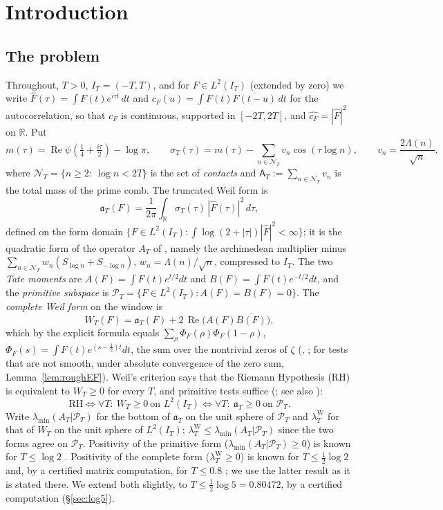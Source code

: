 \documentclass[11pt]{amsart}
\theoremstyle{definition}
\theoremstyle{remark}
\newcommand{\R}{\mathbb R}
\newcommand{\Rel}{\operatorname{Re}}
\newcommand{\PT}{\mathcal P_T}
\newcommand{\IT}{I_T}
\newcommand{\lamW}{\lambda^{\mathrm W}_T}
\newcommand{\lamA}{\lambda_{\min}(A_T|\PT)}
\newcommand{\sT}{\sigma_T}
\newcommand{\Fh}{\widehat F}
\newcommand{\cF}{c_F}
\newcommand{\NT}{\mathcal N_T}
\newcommand{\Aconst}{\mathsf A_T}
\begin{document}
\section{Introduction}

\subsection{The problem}
Throughout, $T>0$, $\IT=(-T,T)$, and for $F\in L^2(\IT)$ (extended by zero) we write
$\Fh(\tau)=\int F(t)e^{i\tau t}\,dt$ and $\cF(u)=\int F(t)\overline{F(t-u)}\,dt$ for the
autocorrelation, so that $\cF$ is continuous, supported in $[-2T,2T]$, and
$\widehat{\cF}=|\Fh|^2$ on $\R$. Put
\begin{equation}\label{eq:symbol}
m(\tau)=\Rel\psi\!\left(\tfrac14+\tfrac{i\tau}{2}\right)-\log\pi,\qquad
\sT(\tau)=m(\tau)-\sum_{n\in\NT}v_n\cos(\tau\log n),\qquad v_n=\frac{2\Lambda(n)}{\sqrt n},
\end{equation}
where $\NT=\{n\ge2:\ \log n<2T\}$ is the set of \emph{contacts} and
$\Aconst:=\sum_{n\in\NT}v_n$ is the total mass of the prime comb. The truncated Weil form is
\begin{equation}\label{eq:form}
\mathfrak a_T(F)=\frac1{2\pi}\int_\R\sT(\tau)\,|\Fh(\tau)|^2\,d\tau ,
\end{equation}
defined on the form domain $\{F\in L^2(\IT):\int\log(2+|\tau|)|\Fh|^2<\infty\}$; it is the
quadratic form of the operator $A_T$ of \cite{Paper42}, namely the archimedean multiplier minus
$\sum_{n\in\NT}w_n(S_{\log n}+S_{-\log n})$, $w_n=\Lambda(n)/\sqrt n$, compressed to $\IT$. The two
\emph{Tate moments} are $A(F)=\int F(t)e^{t/2}dt$ and $B(F)=\int F(t)e^{-t/2}dt$, and the
\emph{primitive subspace} is $\PT=\{F\in L^2(\IT):A(F)=B(F)=0\}$. The \emph{complete Weil form} on
the window is
\begin{equation}\label{eq:W}
W_T(F)=\mathfrak a_T(F)+2\,\Rel\big(A(F)\overline{B(F)}\big),
\end{equation}
which by the explicit formula equals $\sum_\rho\Phi_F(\rho)\Phi_F(1-\rho)$,
$\Phi_F(s)=\int F(t)e^{(s-\frac12)t}dt$, the sum over the nontrivial zeros of $\zeta$
(\cite{Weil52}, \cite[Thm.~8.4]{Paper45}; for tests that are not smooth, under absolute convergence of
the zero sum, Lemma~\ref{lem:roughEF}). Weil's criterion says that the Riemann Hypothesis (RH) is
equivalent to $W_T\ge0$ for every $T$, and primitive tests suffice (\cite[Thm.~11.3]{Paper45}; see
also \cite[Thm.~1]{Bombieri2000}):
\[
\mathrm{RH}\iff \forall T:\ W_T\ge0 \ \text{on }L^2(\IT)\iff \forall T:\ \mathfrak a_T\ge0\ \text{on }\PT .
\]
Write $\lamA$ for the bottom of $\mathfrak a_T$ on the unit sphere of $\PT$ and $\lamW$ for that
of $W_T$ on the unit sphere of $L^2(\IT)$; $\lamW\le\lamA$ since the two forms agree on $\PT$.
Positivity of the primitive form ($\lamA\ge0$) is known for $T\le\log2$ \cite{Paper42}.
Positivity of the complete form ($\lamW\ge0$) is known for $T\le\frac12\log2$
\cite{Yoshida1992,Bombieri2000} and, by a certified matrix computation, for $T\le0.8$
\cite{Zhu2026}; we use the latter result as it is stated there. We extend both slightly, to
$T\le\frac12\log5=0.80472$, by a certified computation (\S\ref{sec:log5}).
\end{document}
